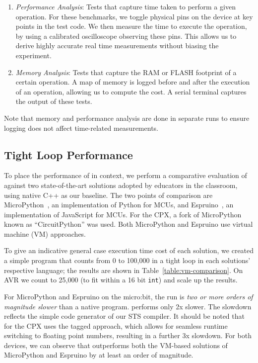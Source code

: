 \begin{enumerate}
    \item \textit{Performance Analysis}: Tests that capture time taken to perform a given operation. For these benchmarks, we toggle physical pins on the device at key points in
    the test code. We then measure the time to
   execute the operation, by using a calibrated oscilloscope observing these pins. This allows us to derive highly accurate real time
   measurements without biasing the experiment.

    \item \textit{Memory Analysis}: Tests that capture the RAM or FLASH footprint of a certain operation. A map of memory is logged before and after the execution of an operation, allowing us to compute the cost.
    A serial terminal captures the output of these tests.
\end{enumerate}

Note that memory and performance analysis are done in separate runs
to ensure logging does not affect time-related measurements.

\subsection{Tight Loop Performance}

To place the performance of \MC in context, we perform a comparative evaluation of \MC against two state-of-the-art
solutions adopted by educators in the classroom, using native C++ as our baseline. The two points of comparison are MicroPython~\cite{MicroPython}, an implementation of Python for MCUs, and Espruino~\cite{espruinoBook}, an implementation of JavaScript for MCUs. For the CPX, a fork of MicroPython known as ``CircuitPython'' was used. Both MicroPython and Espruino use virtual machine (VM) approaches.

To give an indicative general case execution time cost of each solution, we created a simple program that counts from 0 to 100,000 in a tight loop in each solutions' respective language; the results are shown in Table~\ref{table:vm-comparison}. On AVR we count to 25,000 (to fit within a 16 bit \texttt{int}) and scale up the results.

For MicroPython and Espruino on the micro:bit, the run is \emph{two or more orders of magnitude slower} than a native \CO program.
\MC performs only 2x slower. The slowdown reflects the simple code generator of our STS compiler. It should be noted that \MC for the CPX uses the tagged approach, which allows for seamless runtime switching to floating point numbers, resulting in a further 3x slowdown. For both devices, we can observe that \MC outperforms both the VM-based solutions of MicroPython and Espruino by at least an order of magnitude.

